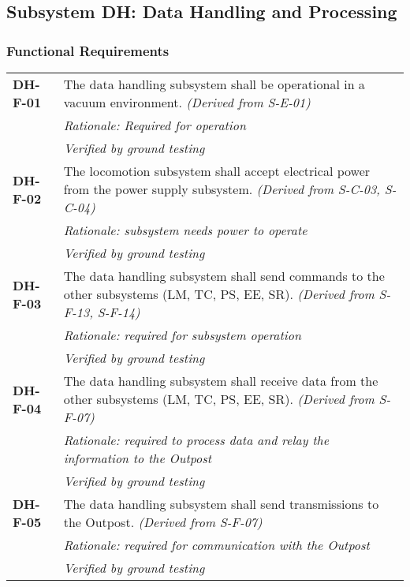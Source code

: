 \subsection{Subsystem DH: Data Handling and Processing}
\label{req_DH}
\subsubsection*{Functional Requirements}
\vspace{-15pt}
\begin{longtable}{P{2cm}P{13.25cm}}
\textbf{DH-F-01}	&
The data handling subsystem shall be operational in a vacuum environment. \textit{(Derived from S-E-01)}\\
& \textit{Rationale: Required for operation}	\\
& \textit{Verified by ground testing}	\\

\textbf{DH-F-02}	& The locomotion subsystem shall accept electrical power from the power supply subsystem. 
\textit{(Derived from S-C-03, S-C-04)}	\\
& \textit{Rationale: subsystem needs power to operate}	\\
& \textit{Verified by ground testing}	\\

\textbf{DH-F-03}	& The data handling subsystem shall send commands to the other subsystems (LM, TC, PS, EE, SR). 
\textit{(Derived from S-F-13, S-F-14)}\\ 
& \textit{Rationale: required for subsystem operation} \\
& \textit{Verified by ground testing}	\\

\textbf{DH-F-04}	& The data handling subsystem shall receive data from the other subsystems (LM, TC, PS, EE, SR). \textit{(Derived from S-F-07)} \\
 &	\textit{Rationale: required to process data and relay the information to the Outpost} \\
 &	\textit{Verified by ground testing}			\\

\textbf{DH-F-05}	& The data handling subsystem shall send transmissions to the Outpost. 
\textit{(Derived from S-F-07)}\\
& \textit{Rationale: required for communication with the Outpost} \\
& \textit{Verified by ground testing}	\\


\end{longtable}
